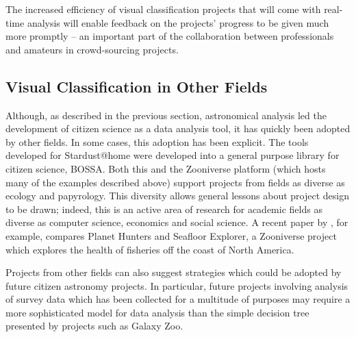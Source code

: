 \documentclass{ar2e}
\begin{document}
The increased  efficiency of visual classification projects that will come with
real-time analysis will enable feedback on the projects' progress to be given
much more promptly -- an important part of the collaboration between
professionals and amateurs in crowd-sourcing projects.



\subsection{Visual Classification in Other Fields}
\label{sec:class:non-astro}

Although, as described in the previous section, astronomical analysis led the
development of citizen science as a data analysis tool, it has quickly been
adopted by other fields. In some cases, this adoption has been explicit. The
tools developed for Stardust@home were developed into a general purpose
library for citizen science, BOSSA.
Both this and the Zooniverse platform (which hosts many of the examples
described above) support projects from fields as diverse as ecology and
papyrology. This diversity allows general lessons about project
design to be drawn; indeed, this is an active area of research for academic
fields as diverse as computer science, economics and social science. A recent paper
by \citet{Mugar}, for example, compares Planet Hunters and Seafloor Explorer, 
a Zooniverse project which explores the health of fisheries off the coast of
North America. 


Projects from other fields can also suggest strategies which could be adopted
by future citizen astronomy projects. In particular, future projects involving
analysis of survey data which has been collected for a multitude of purposes
may require a more sophisticated model for data analysis than the simple
decision tree presented by projects such as Galaxy Zoo. 

\end{document}
